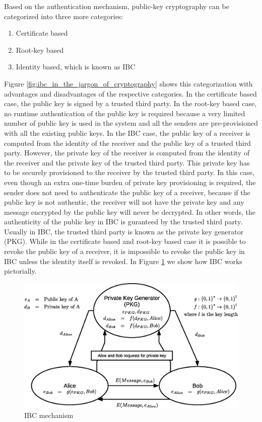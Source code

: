 \documentclass[lnicst,sechang,a4paper]{svmultln}
\begin{document}
Based on the authentication mechanism, public-key cryptography can be categorized into three more categories:
\begin{enumerate}
\item Certificate based
\item Root-key based
\item Identity based, which is known as IBC
\end{enumerate} Figure \ref{fig:ibc_in_the_jargon_of_cryptography} shows this categorization with advantages and disadvantages of the respective categories. In the certificate based case, the public key is signed by a trusted third party. In the root-key based case, no runtime authentication of the public key is required because a very limited number of public key is used in the system and all the senders are pre-provisioned with all the existing public keys. In the IBC case, the public key of a receiver is computed from the identity of the receiver and the public key of a trusted third party. However, the private key of the receiver is computed from the identity of the receiver and the private key of the trusted third party. This private key has to be securely provisioned to the receiver by the trusted third party. In this case, even though an extra one-time burden of private key provisioning is required, the sender does not need to authenticate the public key of a receiver, because if the public key is not authentic, the receiver will not have the private key and any message encrypted by the public key will never be decrypted. In other words, the authenticity of the public key in IBC is guranteed by the trusted third party. Usually in IBC, the trusted third party is known as the private key generator (PKG). While in the certificate based and root-key based case it is possible to revoke the public key of a receiver, it is impossible to revoke the public key in IBC unless the identity itself is revoked. In Figure \ref{fig:how_ibc_works} we show how IBC works pictorially.


\begin{figure}
\begin{center}
  \includegraphics[width=.98\textwidth]{how_ibc_works.eps}
\caption{IBC mechanism}
\label{fig:how_ibc_works}       %
\end{center}
\end{figure}
\end{document}
